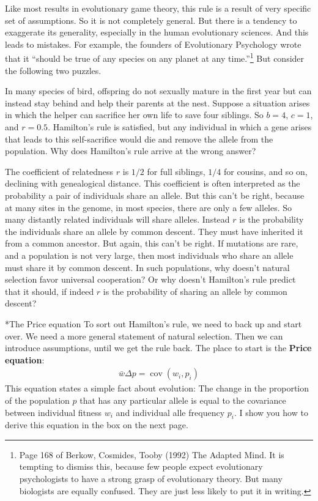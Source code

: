 \documentclass[10pt,reqno]{amsbook}
\makeatletter
\DeclareMathOperator{\cov}{cov}
\newcommand{\bemph}[1]{{\textbf{\textcolor{bemphcol}{#1}}}}
\renewcommand\subsection{\@startsection{subsection}{2}
\z@{.5\linespacing\@plus.7\linespacing}{-.5em}%
{\normalfont\normalsize\bfseries}}
\numberwithin{equation}{chapter}
\makeatother
\begin{document}
Like most results in evolutionary game theory, this rule is a result of very specific set of assumptions. So it is not completely general. But there is a tendency to exaggerate its generality, especially in the human evolutionary sciences. And this leads to mistakes. For example, the founders of Evolutionary Psychology wrote that it ``should be true of any species on any planet at any time.''\footnote{Page 168 of Berkow, Cosmides, Tooby (1992) The Adapted Mind. It is tempting to dismiss this, because few people expect evolutionary psychologists to have a strong grasp of evolutionary theory. But many biologists are equally confused. They are just less likely to put it in writing.} But consider the following two puzzles.

In many species of bird, offspring do not sexually mature in the first year but can instead stay behind and help their parents at the nest. Suppose a situation arises in which the helper can sacrifice her own life to save four siblings. So $b=4$, $c=1$, and $r=0.5$. Hamilton's rule is satisfied, but any individual in which a gene arises that leads to this self-sacrifice would die and remove the allele from the population. Why does Hamilton's rule arrive at the wrong answer?

The coefficient of relatedness $r$ is $1/2$ for full siblings, $1/4$ for cousins, and so on, declining with genealogical distance. This coefficient is often interpreted as the probability a pair of individuals share an allele. But this can't be right, because at many sites in the genome, in most species, there are only a few alleles. So many distantly related individuals will share alleles. Instead $r$ is the probability the individuals share an allele by common descent. They must have inherited it from a common ancestor. But again, this can't be right. If mutations are rare, and a population is not very large, then most individuals who share an allele must share it by common descent. In such populations, why doesn't natural selection favor universal cooperation? Or why doesn't Hamilton's rule predict that it should, if indeed $r$ is the probability of sharing an allele by common descent?


\subsection*{The Price equation}
To sort out Hamilton's rule, we need to back up and start over. We need a more general statement of natural selection. Then we can introduce assumptions, until we get the rule back. The place to start is the \bemph{Price equation}:
\begin{align*}
	\bar w \Delta p = \cov(w_i,p_i)
\end{align*}
This equation states a simple fact about evolution: The change in the proportion of the population $p$ that has any particular allele is equal to the covariance between individual fitness $w_i$ and individual alle frequency $p_i$. I show you how to derive this equation in the box on the next page. 
\end{document}
